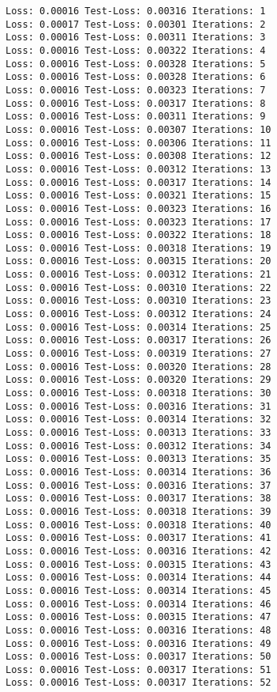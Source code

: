 \documentclass[11pt]{article}
\begin{document}
    \begin{Verbatim}[commandchars=\\\{\}]
Loss: 0.00016 Test-Loss: 0.00316 Iterations: 1
Loss: 0.00017 Test-Loss: 0.00301 Iterations: 2
Loss: 0.00016 Test-Loss: 0.00311 Iterations: 3
Loss: 0.00016 Test-Loss: 0.00322 Iterations: 4
Loss: 0.00016 Test-Loss: 0.00328 Iterations: 5
Loss: 0.00016 Test-Loss: 0.00328 Iterations: 6
Loss: 0.00016 Test-Loss: 0.00323 Iterations: 7
Loss: 0.00016 Test-Loss: 0.00317 Iterations: 8
Loss: 0.00016 Test-Loss: 0.00311 Iterations: 9
Loss: 0.00016 Test-Loss: 0.00307 Iterations: 10
Loss: 0.00016 Test-Loss: 0.00306 Iterations: 11
Loss: 0.00016 Test-Loss: 0.00308 Iterations: 12
Loss: 0.00016 Test-Loss: 0.00312 Iterations: 13
Loss: 0.00016 Test-Loss: 0.00317 Iterations: 14
Loss: 0.00016 Test-Loss: 0.00321 Iterations: 15
Loss: 0.00016 Test-Loss: 0.00323 Iterations: 16
Loss: 0.00016 Test-Loss: 0.00323 Iterations: 17
Loss: 0.00016 Test-Loss: 0.00322 Iterations: 18
Loss: 0.00016 Test-Loss: 0.00318 Iterations: 19
Loss: 0.00016 Test-Loss: 0.00315 Iterations: 20
Loss: 0.00016 Test-Loss: 0.00312 Iterations: 21
Loss: 0.00016 Test-Loss: 0.00310 Iterations: 22
Loss: 0.00016 Test-Loss: 0.00310 Iterations: 23
Loss: 0.00016 Test-Loss: 0.00312 Iterations: 24
Loss: 0.00016 Test-Loss: 0.00314 Iterations: 25
Loss: 0.00016 Test-Loss: 0.00317 Iterations: 26
Loss: 0.00016 Test-Loss: 0.00319 Iterations: 27
Loss: 0.00016 Test-Loss: 0.00320 Iterations: 28
Loss: 0.00016 Test-Loss: 0.00320 Iterations: 29
Loss: 0.00016 Test-Loss: 0.00318 Iterations: 30
Loss: 0.00016 Test-Loss: 0.00316 Iterations: 31
Loss: 0.00016 Test-Loss: 0.00314 Iterations: 32
Loss: 0.00016 Test-Loss: 0.00313 Iterations: 33
Loss: 0.00016 Test-Loss: 0.00312 Iterations: 34
Loss: 0.00016 Test-Loss: 0.00313 Iterations: 35
Loss: 0.00016 Test-Loss: 0.00314 Iterations: 36
Loss: 0.00016 Test-Loss: 0.00316 Iterations: 37
Loss: 0.00016 Test-Loss: 0.00317 Iterations: 38
Loss: 0.00016 Test-Loss: 0.00318 Iterations: 39
Loss: 0.00016 Test-Loss: 0.00318 Iterations: 40
Loss: 0.00016 Test-Loss: 0.00317 Iterations: 41
Loss: 0.00016 Test-Loss: 0.00316 Iterations: 42
Loss: 0.00016 Test-Loss: 0.00315 Iterations: 43
Loss: 0.00016 Test-Loss: 0.00314 Iterations: 44
Loss: 0.00016 Test-Loss: 0.00314 Iterations: 45
Loss: 0.00016 Test-Loss: 0.00314 Iterations: 46
Loss: 0.00016 Test-Loss: 0.00315 Iterations: 47
Loss: 0.00016 Test-Loss: 0.00316 Iterations: 48
Loss: 0.00016 Test-Loss: 0.00316 Iterations: 49
Loss: 0.00016 Test-Loss: 0.00317 Iterations: 50
Loss: 0.00016 Test-Loss: 0.00317 Iterations: 51
Loss: 0.00016 Test-Loss: 0.00317 Iterations: 52

\end{Verbatim}
\end{document}
